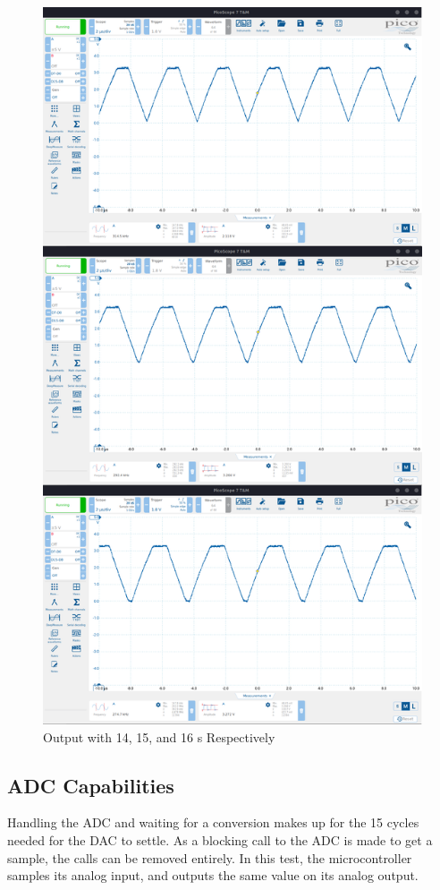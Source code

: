 \begin{figure}[H]
    \centering
    \includegraphics[width=120mm, keepaspectratio]{figures/comp.png}
    \caption{Output with 14, 15, and 16 s Respectively}
    \label{fig:comp}
\end{figure}

\subsection{ADC Capabilities}

Handling the ADC and waiting for a conversion makes up for the 15 cycles needed for the DAC to settle. As a blocking call to the ADC is made to get a sample, the  calls can be removed entirely. In this test, the microcontroller samples its analog input, and outputs the same value on its analog output.

